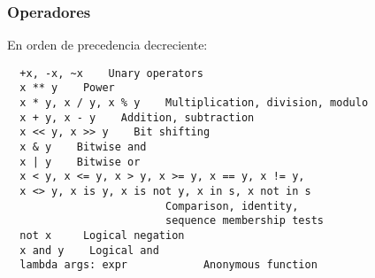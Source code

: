 \documentclass[ucs]{beamer}
\begin{document}
\begin{frame}[fragile]

\frametitle{Operadores }
  \begin{center}
En orden de precedencia decreciente:
  \end{center}
  

  \begin{scriptsize}
\begin{verbatim}
  +x, -x, ~x    Unary operators
  x ** y    Power 
  x * y, x / y, x % y    Multiplication, division, modulo
  x + y, x - y    Addition, subtraction
  x << y, x >> y    Bit shifting
  x & y    Bitwise and
  x | y    Bitwise or
  x < y, x <= y, x > y, x >= y, x == y, x != y,
  x <> y, x is y, x is not y, x in s, x not in s  
                         Comparison, identity, 
                         sequence membership tests
  not x     Logical negation
  x and y    Logical and
  lambda args: expr            Anonymous function
\end{verbatim}
  \end{scriptsize}

\end{frame}

\end{document}
